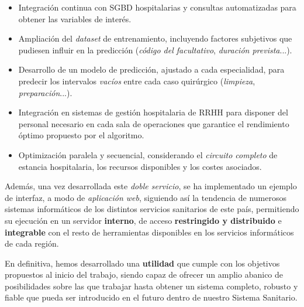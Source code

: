 \begin{itemize}
    \item Integración continua con SGBD hospitalarias y consultas automatizadas para obtener las variables de interés.
    \item Ampliación del \textit{dataset} de entrenamiento, incluyendo factores subjetivos que pudiesen influir en la predicción (\textit{código del facultativo}, \textit{duración prevista}...).
    \item Desarrollo de un modelo de predicción, ajustado a cada especialidad, para predecir los intervalos \textit{vacíos} entre cada caso quirúrgico (\textit{limpieza}, \textit{preparación}...).
    \item Integración en sistemas de gestión hospitalaria de RRHH para disponer del personal necesario en cada sala de operaciones que garantice el rendimiento óptimo propuesto por el algoritmo.
    \item Optimización paralela y secuencial, considerando el \textit{circuito completo} de estancia hospitalaria, los recursos disponibles y los costes asociados.
\end{itemize}

Además, una vez desarrollada este \textit{doble servicio}, se ha implementado un ejemplo de interfaz, a modo de \textit{aplicación web}, siguiendo así la tendencia de numerosos sistemas informáticos de los distintos servicios sanitarios de este país, permitiendo su ejecución en un servidor \textbf{interno}, de acceso \textbf{restringido y distribuido} e \textbf{integrable} con el resto de herramientas disponibles en los servicios informáticos de cada región.

En definitiva, hemos desarrollado una \textbf{utilidad} que cumple con los objetivos propuestos al inicio del trabajo, siendo capaz de ofrecer un amplio abanico de posibilidades sobre las que trabajar hasta obtener un sistema completo, robusto y fiable que pueda ser introducido en el futuro dentro de nuestro Sistema Sanitario.